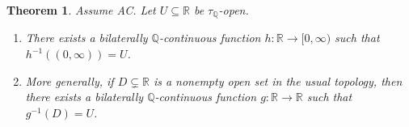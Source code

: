 \documentclass[11pt]{amsart} %
\newtheorem{theorem}{Theorem}[section]
\theoremstyle{definition}
\newcommand{\Q}{\mathbb{Q}}
\begin{document}
\begin{theorem}%
\label{thm:5.13}
Assume AC. 
Let $U\subseteq\mathbb{R}$ be $\tau_{\Q}$-open.
\begin{enumerate}
    \item[(1)] There exists a bilaterally $\mathbb{Q}$-continuous function $h:\mathbb{R}\rightarrow[0,\infty)$ such that $h^{-1}((0,\infty))=U$.
    \item[(2)] More generally, if $D\subsetneq\mathbb{R}$ is a nonempty open set in the usual topology, then there exists a bilaterally $\mathbb{Q}$-continuous function $g:\mathbb{R}\rightarrow\mathbb{R}$ such that $g^{-1}(D)=U$.
\end{enumerate}
\end{theorem}
\end{document}
